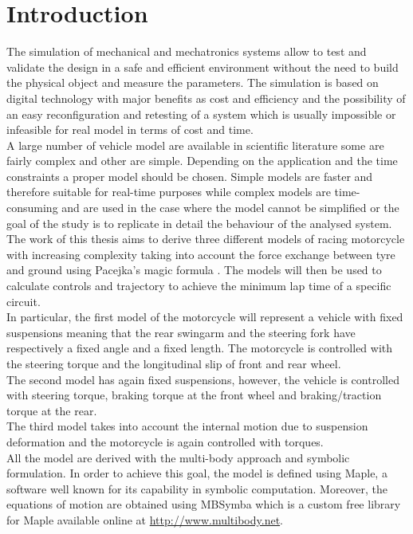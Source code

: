 \chapter*{Introduction}

The simulation of mechanical and mechatronics systems allow to test and validate the design in a safe and efficient environment without the need to build the physical object and measure the parameters. The simulation is based on digital technology with major benefits as cost and efficiency and the possibility of an easy reconfiguration and retesting of a system which is usually impossible or infeasible for real model in terms of cost and time.\cite{maria1997introduction}\\
A large number of vehicle model are available in scientific literature some are fairly complex and other are simple. Depending on the application and the time constraints a proper model should be chosen. Simple models are faster and therefore suitable for real-time purposes while complex models are time-consuming and are used in the case where the model cannot be simplified or the goal of the study is to replicate in detail the behaviour of the analysed system.\\
The work of this thesis aims to derive three different models of racing motorcycle with increasing complexity taking into account the force exchange between tyre and ground using Pacejka's magic formula \cite{pacejka2006tyre}. The models will then be used to calculate controls and trajectory to achieve the minimum lap time of a specific circuit.\\
In particular, the first model of the motorcycle will represent a vehicle with fixed suspensions meaning that the rear swingarm and the steering fork have respectively a fixed angle and a fixed length. The motorcycle is controlled with the steering torque and the longitudinal slip of front and rear wheel.\\
The second model has again fixed suspensions, however, the vehicle is controlled with steering torque, braking torque at the front wheel and braking/traction torque at the rear.\\  
The third model takes into account the internal motion due to suspension deformation and the motorcycle is again controlled with torques.\\
All the model are derived with the multi-body approach and symbolic formulation. In order to achieve this goal, the model is defined using Maple, a software well known for its capability in symbolic computation. Moreover, the equations of motion are obtained using MBSymba which is a custom free library for Maple available online at \url{http://www.multibody.net}.\\
